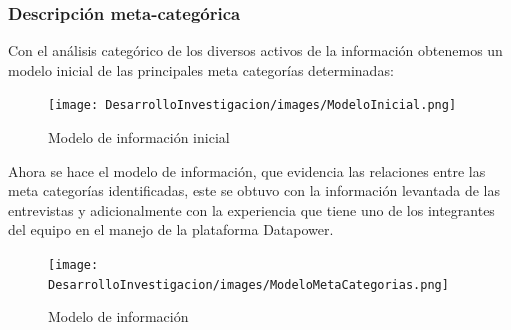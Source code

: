 \subsubsection{Descripción meta-categórica}
Con el análisis categórico de los diversos activos de la información obtenemos un modelo inicial de las principales meta categorías determinadas:
\begin{figure}[th!]
    \centering
    \texttt{[image: DesarrolloInvestigacion/images/ModeloInicial.png]}
    \caption{Modelo de información inicial}
\end{figure}
Ahora se hace el modelo de información, que evidencia las relaciones entre las meta categorías identificadas, este se obtuvo con la información levantada de las entrevistas y adicionalmente con la experiencia que tiene uno de los integrantes del equipo en el manejo de la plataforma Datapower.
\begin{figure}[th!]
    \centering
    \texttt{[image: DesarrolloInvestigacion/images/ModeloMetaCategorias.png]}
    \caption{Modelo de información}
\end{figure}
